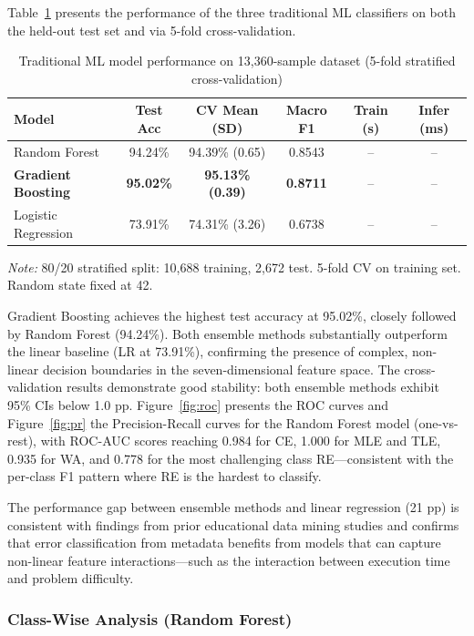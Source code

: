 \documentclass[10pt,a4paper]{article}
\begin{document}
Table~\ref{tab:ml-results} presents the performance of the three traditional
ML classifiers on both the held-out test set and via 5-fold cross-validation.

\begin{table}[htbp]
\centering
\caption{Traditional ML model performance on 13,360-sample dataset (5-fold stratified cross-validation)}
\label{tab:ml-results}
\begin{tabular}{@{}lccccc@{}}
\toprule
Model & Test Acc & CV Mean (\textpm{}SD) & Macro F1 & Train (s) & Infer (ms) \\
\midrule
Random Forest       & 94.24\% & 94.39\% (\textpm{}0.65) & 0.8543 & -- & -- \\
\textbf{Gradient Boosting}   & \textbf{95.02\%} & \textbf{95.13\% (\textpm{}0.39)} & \textbf{0.8711} & -- & -- \\
Logistic Regression & 73.91\% & 74.31\% (\textpm{}3.26) & 0.6738 & -- & -- \\
\bottomrule
\end{tabular}
\end{table}

{\small \textit{Note:} 80/20 stratified split: 10,688 training, 2,672 test. 5-fold CV on training set. Random state fixed at 42.}

Gradient Boosting achieves the highest test accuracy at 95.02\%, closely followed by
Random Forest (94.24\%). Both ensemble methods substantially outperform
the linear baseline (LR at 73.91\%), confirming the presence of complex,
non-linear decision boundaries in the seven-dimensional feature space. The cross-validation
results demonstrate good stability: both ensemble methods exhibit 95\% CIs below
\textpm{}1.0 pp.
Figure~\ref{fig:roc} presents the ROC curves and Figure~\ref{fig:pr} the
Precision-Recall curves for the Random Forest model (one-vs-rest), with
ROC-AUC scores reaching 0.984 for CE, 1.000 for MLE and TLE, 0.935 for WA,
and 0.778 for the most challenging class RE---consistent with the per-class F1
pattern where RE is the hardest to classify.

The performance gap between ensemble methods and linear regression (21
pp) is consistent with findings from prior educational data mining studies
and confirms that error
classification from metadata benefits from models that can capture non-linear
feature interactions---such as the interaction between execution time and
problem difficulty.

\subsubsection*{Class-Wise Analysis (Random Forest)}
\end{document}
